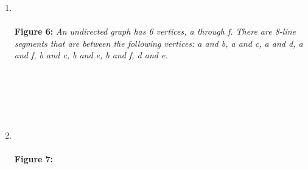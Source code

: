 \documentclass{amsart}
\theoremstyle{definition}
\theoremstyle{Exercise}
\theoremstyle{remark}
\theoremstyle{rule}
\numberwithin{equation}{section}
\begin{document}
  \begin{enumerate}[label=(\alph*)]
\item 
{}
\\\\
{\color{blue} {\bf Figure 6:} \emph{An undirected graph has 6 vertices, a through f. There are 8-line segments that are between the following vertices: a and b, a and c, a and d, a and f, b and c, b and e, b and f, d and e. 
  }
}\\\\
\\\\
   \newpage
~\\~\\
\item
{}
\\\\
{\color{blue} {\bf Figure 7:} \emph{
}}
\end{enumerate}
\end{document}
